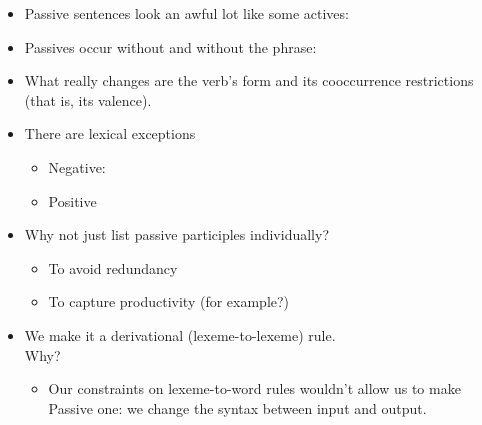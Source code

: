 \documentclass[a4paper,landscape,headrule,footrule,dvips]{foils}
\begin{document}
\begin{itemize}
\item Passive sentences look an awful lot like some actives:  
  \begin{exe}
    \ex {}
    \ex {}   
  \end{exe}
\item Passives occur without  and without the  phrase:
  \begin{exe}
    \ex {}
    \ex {}
\end{exe}
\end{itemize}




\begin{itemize}
\item What really changes are the verb’s form and its 
cooccurrence restrictions (that is, its valence).
\item There are lexical exceptions
  \begin{itemize}
  \item Negative:  
    \begin{exe}
      \ex {} 
      \ex  *
      \ex {}
      \ex *
    \end{exe}
  \item Positive
    \begin{exe}
      \ex {}
      \ex *
    \end{exe}
  \end{itemize}
\end{itemize}  


\begin{itemize}
\item Why not just list passive participles individually?
  \begin{itemize}
  \item To avoid redundancy
  \item To capture productivity (for example?)
  \end{itemize}
\item We make it a derivational (lexeme-to-lexeme) rule.  
  \\ Why?
  \begin{itemize}
  \item Our constraints on lexeme-to-word rules wouldn’t allow 
    us to make Passive one: we change the syntax between input and output.
  \end{itemize}
\end{itemize}  
\end{document}
